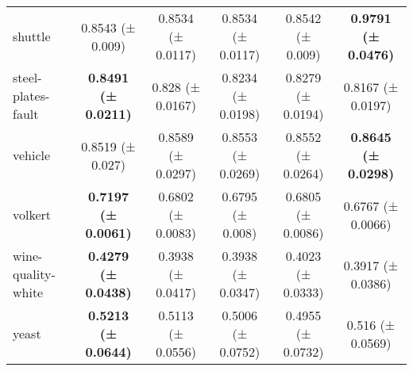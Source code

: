 \documentclass[11pt]{article}
\begin{document}
\begin{table}[]
{\begin{tabular}{@{}lccccc@{}}
shuttle       & 0.8543 (± 0.009)           & 0.8534 (± 0.0117)          & 0.8534 (± 0.0117)          & 0.8542 (± 0.009)           & \textbf{0.9791 (± 0.0476)} \\
steel-plates-fault                     & \textbf{0.8491 (± 0.0211)} & 0.828 (± 0.0167)  & 0.8234 (± 0.0198) & 0.8279 (± 0.0194) & 0.8167 (± 0.0197) \\
vehicle       & 0.8519 (± 0.027)           & 0.8589 (± 0.0297)          & 0.8553 (± 0.0269)          & 0.8552 (± 0.0264)          & \textbf{0.8645 (± 0.0298)} \\
volkert       & \textbf{0.7197 (± 0.0061)} & 0.6802 (± 0.0083)          & 0.6795 (± 0.008)           & 0.6805 (± 0.0086)          & 0.6767 (± 0.0066)          \\
wine-quality-white                     & \textbf{0.4279 (± 0.0438)} & 0.3938 (± 0.0417) & 0.3938 (± 0.0347) & 0.4023 (± 0.0333) & 0.3917 (± 0.0386) \\
yeast         & \textbf{0.5213 (± 0.0644)} & 0.5113 (± 0.0556)          & 0.5006 (± 0.0752)          & 0.4955 (± 0.0732)          & 0.516 (± 0.0569)           \\ \bottomrule
\end{tabular}%
}
\end{table}
\end{document}
